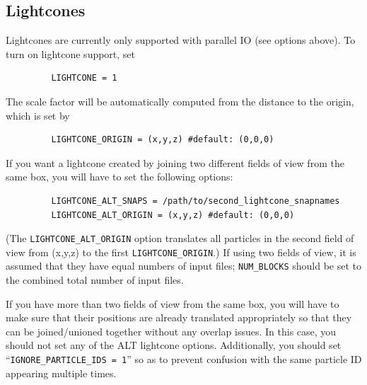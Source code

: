 \documentclass[12pt]{article}
\begin{document}
\subsection{Lightcones}
      Lightcones are currently only supported with parallel IO (see options
      above).  To turn on lightcone support, set
\begin{verbatim}
         LIGHTCONE = 1
\end{verbatim}
      The scale factor will be automatically computed
      from the distance to the origin, which is set by
\begin{verbatim}
         LIGHTCONE_ORIGIN = (x,y,z) #default: (0,0,0)
\end{verbatim}
      If you want a lightcone created by joining two different fields of view
      from the same box, you will have to set the following options:
\begin{verbatim}
         LIGHTCONE_ALT_SNAPS = /path/to/second_lightcone_snapnames
         LIGHTCONE_ALT_ORIGIN = (x,y,z) #default: (0,0,0)
\end{verbatim}
      (The \texttt{LIGHTCONE\_ALT\_ORIGIN} option translates all particles in the second
      field of view from (x,y,z) to the first \texttt{LIGHTCONE\_ORIGIN}.)  If using two
      fields of view, it is assumed that they have equal numbers of input files;
      \texttt{NUM\_BLOCKS} should be set to the combined total number of input files.

      If you have more than two fields of view from the same box, you will
      have to make sure that their positions are already translated
      appropriately so that they can be joined/unioned together without any
      overlap issues.  In this case, you should not set any of the ALT lightcone
      options.  Additionally, you should set ``\texttt{IGNORE\_PARTICLE\_IDS = 1}'' so as
      to prevent confusion with the same particle ID appearing multiple times.
\end{document}
